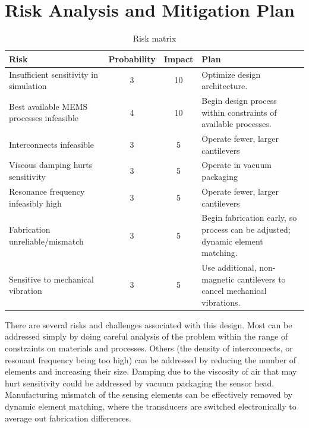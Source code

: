 \section{Risk Analysis and Mitigation Plan}

\begin{table}[h!]
\centering
\begin{tabularx}{.85\textwidth}{|X||c|c|X|}
    \hline
    Risk & Probability & Impact & Plan\\
    \hline
    \hline
    Insufficient sensitivity in simulation & 3 & 10 & Optimize design architecture. \\
    \hline
    Best available MEMS processes infeasible & 4 & 10 & Begin design process within constraints of available processes. \\
    \hline
    Interconnects infeasible & 3 & 5 & Operate fewer, larger cantilevers \\
    \hline
    Viscous damping hurts sensitivity & 3 & 5 & Operate in vacuum packaging \\
    \hline
    Resonance frequency infeasibly high & 3  & 5 & Operate fewer, larger cantilevers \\
    \hline
    Fabrication unreliable/mismatch & 3 & 5 & Begin fabrication early, so process can be adjusted; dynamic element matching. \\
    \hline
    Sensitive to mechanical vibration & 3 & 5 & Use additional, non-magnetic cantilevers to cancel mechanical vibrations. \\
    \hline
\end{tabularx}
\caption{Risk matrix}
\label{table:risk}
\end{table}

There are several risks and challenges associated with this design. Most can be addressed simply by doing careful analysis of the problem within the range of constraints on materials and processes. Others (the density of interconnects, or resonant frequency being too high) can be addressed by reducing the number of elements and increasing their size. Damping due to the viscosity of air that may hurt sensitivity could be addressed by vacuum packaging the sensor head. Manufacturing mismatch of the sensing elements can be effectively removed by dynamic element matching, where the transducers are switched electronically to average out fabrication differences.


